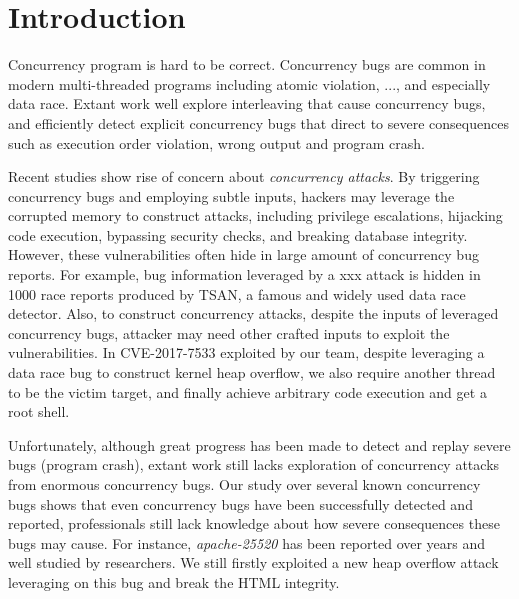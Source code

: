 \section{Introduction} \label{sec:intro}


Concurrency program is hard to be correct. 
Concurrency bugs are common in modern multi-threaded programs\cite{lu:concurrency-bugs,conmem:asplos10,conseq:asplos11, lu:muvi:sosp} 
including atomic violation, ..., and especially data race.
Extant work well explore interleaving that cause concurrency bugs, 
and efficiently detect explicit concurrency bugs that direct to  
severe consequences such as execution order violation, wrong output and program crash.

Recent studies\cite{acidrain:sigmod17,con:hotpar12} show rise of concern about \emph{concurrency attacks}.
By triggering concurrency bugs and employing subtle inputs, 
hackers may leverage the corrupted memory to construct 
attacks, including privilege escalations\cite{}, hijacking code execution\cite{}, bypassing security checks\cite{}, 
and breaking database integrity\cite{acidrain:sigmod17}.
However, these vulnerabilities often hide in large amount of concurrency bug reports. 
For example, bug information leveraged by a xxx attack is hidden in 1000 race reports 
produced by TSAN\cite{tsan}, a famous and widely used data race detector. 
Also, to construct concurrency attacks, despite the inputs of leveraged concurrency bugs, 
attacker may need other crafted inputs to exploit the vulnerabilities. 
In CVE-2017-7533 exploited by our team, 
despite leveraging a data race bug to construct kernel heap overflow, 
we also require another thread to be the victim target, 
and finally achieve arbitrary code execution and get a root shell.   


Unfortunately, although great progress has been made to detect and replay severe bugs (program crash\cite{conmem:asplos10}), 
extant work still lacks exploration of concurrency attacks from enormous concurrency bugs. Our study over several known concurrency 
bugs\cite{apache-bug-25520, apache-bug-46215} shows that even concurrency bugs have been successfully detected and reported, 
professionals still lack knowledge about how severe consequences these bugs may cause. 
For instance, \emph{apache-25520}\cite{apache-bug-25520} has been 
reported over years and well studied by researchers\cite{lu:concurrency-bugs}.  
We still firstly exploited a new heap overflow attack leveraging on this bug and break the HTML integrity.  


